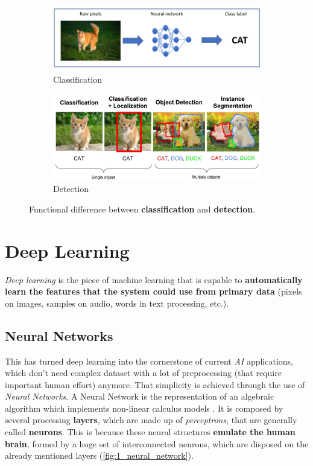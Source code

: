 \begin{figure}[h!]
	\centering
	\begin{subfigure}[h!]{0.6\textwidth}
		\includegraphics[width=\textwidth]{images/classification}
		\caption{Classification}
		\label{fig:1_classification}
	\end{subfigure}
	
	\qquad
	
	\begin{subfigure}[h!]{0.6\textwidth}
		\includegraphics[width=\textwidth]{images/detection}
		\caption{Detection}
		\label{fig:1_detection}			
	\end{subfigure}
	
	\caption{Functional difference between \textbf{classification} and \textbf{detection}.}
	\label{fig:1_class_vs_det}
\end{figure}

\section{Deep Learning}
\emph{Deep learning} is the piece of machine learning that is capable to \textbf{automatically learn the features that the system could use from primary data} (pixels on images, samples on audio, words in text processing, etc.).\\
\subsection{Neural Networks}
This has turned deep learning into the cornerstone of current \emph{AI} applications, which don't need complex dataset with a lot of preprocessing (that require important human effort) anymore. That simplicity is achieved through the use of \emph{Neural Networks}. A Neural Network is the representation of an algebraic algorithm which implements non-linear calculus models \cite{dl-nature}. It is composed by several processing \textbf{layers}, which are made up of \emph{perceptrons}, that are generally called \textbf{neurons}. This is because these neural structures \textbf{emulate the human brain}, formed by a huge set of interconnected neurons, which are disposed on the already mentioned layers (\autoref{fig:1_neural_network}).\\

